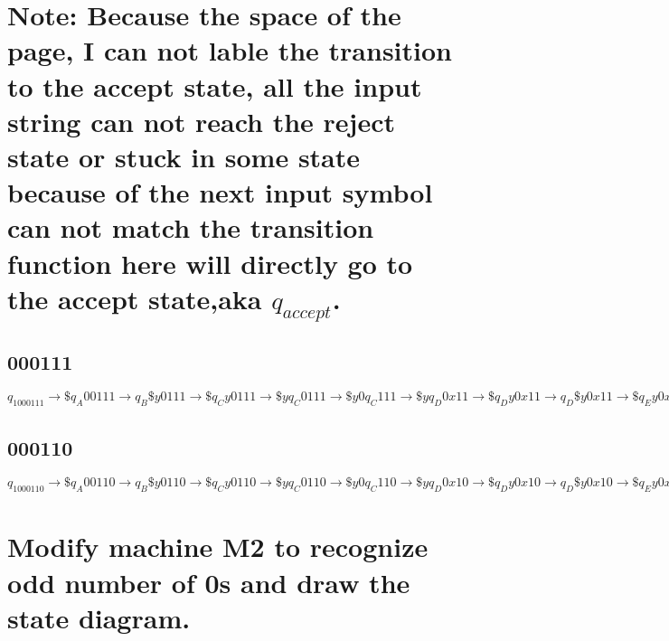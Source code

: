 \documentclass{scrartcl}
\newcommand{\bl}{{\sqcup}}
\begin{document}
\section*{Note: Because the space of the page, I can not lable the transition to the accept state, all the input string can not reach the reject state or stuck in some state because of the next input symbol can not match the transition function here will directly go to the accept state,aka $q_{accept}$.} 
\subsection*{000111}
$q_1000111\to\$q_A00111\to q_B\$y0111\to\$q_Cy0111\to\$yq_C0111\to\$y0q_C111
\to\$yq_D0x11\to\$q_Dy0x11\to q_D\$y0x11\to\$q_Ey0x11\to\$yq_E0x11\to\$y0q_Ex11
\to\$y0xq_E11\to\$y0q_Fxx1\to\$yq_F0xx1\to\$q_Fy0xx1\to q_F\$y0xx1\to \$q_Gy0xx1
\to \$yq_G0xx1\to\$yyq_Hxx1\to\$yyxq_Hx1\to\$yyxxq_H1\to\$yyxx1q_H\bl
\to\$yyxx1\bl q_{accept}$


\subsection*{000110}
$q_1000110\to\$q_A00110\to q_B\$y0110\to\$q_Cy0110\to\$yq_C0110\to\$y0q_C110
\to\$yq_D0x10\to\$q_Dy0x10\to q_D\$y0x10\to\$q_Ey0x10\to\$yq_E0x10\to\$y0q_Ex10
\to\$y0xq_E10\to\$y0q_Fxx0\to\$yq_F0xx0\to\$q_Fy0xx0\to q_F\$y0xx0\to \$q_Gy0xx0
\to \$yq_G0xx0\to\$yyq_Hxx0\to\$yyxq_Hx0\to\$yyxxq_H0\to\$yyxq_Ixy\to\$yyq_Ixxy
\to\$yq_Iyxxy\to\$q_Iyyxxy\to q_I\$yyxxy\to\$q_Eyyxxy\to\$yq_Eyxxy\to\$yyq_Exxy
\to\$yyxq_Exy\to\$yyxxq_Ey\to\$yyxxyq_E\bl\to\$yyxxq_Jy\bl\to\$yyxq_Jxy\bl
\to\$yyq_Jxxy\bl\to\$yq_Jyxxy\bl\to\$q_Jyyxxy\bl\to q_J\$yyxxy\bl\to\$q_Kyyxxy\bl
\to\$yq_Kyxxy\bl\to\$yyq_Kxxy\bl\to\$yyxq_Kxy\bl\to\$yyxxq_Ky\bl\to\$yyxxyq_K\bl
\to\$yyxxy\bl q_{reject}$


\section*{Modify machine M2 to recognize odd number of 0s and draw the state diagram.}

\end{document}

